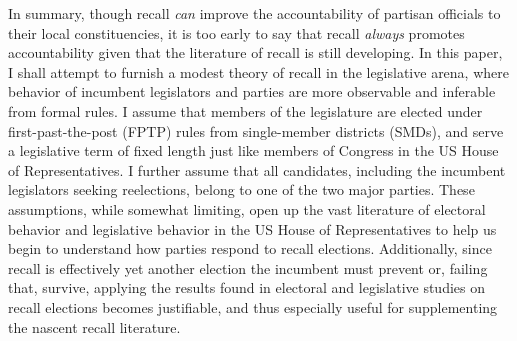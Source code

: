 \documentclass{article}
\begin{document}
		In summary, though recall \textit{can} improve
		the accountability of partisan officials to their local constituencies,
		it is too early to say that recall \textit{always} promotes accountability
		given that the literature of recall is still developing.
		In this paper,
		I shall attempt to furnish a modest theory of recall
		in the legislative arena,
		where behavior of
		incumbent legislators and parties
		are more observable and inferable from formal rules.
		I assume that members of the legislature
		are elected under first-past-the-post (FPTP) rules
		from single-member districts (SMDs),
		and serve a legislative term of fixed length
		just like members of Congress in the US House of Representatives.
		I further assume that all candidates,
		including the incumbent legislators seeking reelections,
		belong to one of the two major parties.
		These assumptions,
		while somewhat limiting,
		open up the vast literature of electoral behavior and legislative behavior in the US House of Representatives
		to help us begin to understand how parties respond to recall elections.
		Additionally,
		since recall is effectively yet another election
		the incumbent must prevent or, failing that, survive,
		applying the results found in
		electoral and legislative studies on recall elections
		becomes justifiable,
		and thus especially useful for supplementing the nascent recall literature.

%		
		
\end{document}

